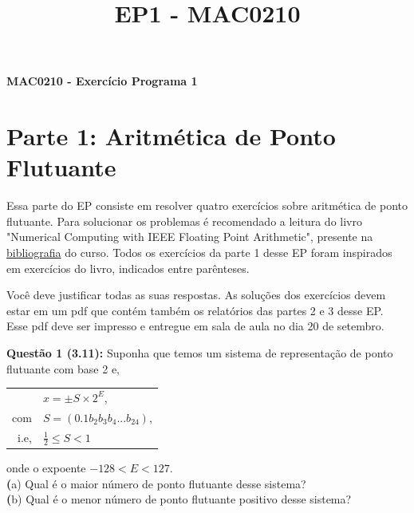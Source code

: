 \documentclass[12pt]{article}
\newcommand{\questao}[1] {\vspace{12pt} \noindent \large \textbf{Questão #1:} \normalsize}
\renewcommand{\part}[1] {\noindent\textbf (#1)}
\begin{document}
\title{EP1 - MAC0210}
\begin{flushleft}
    \textbf{\fontsize{20pt}{2em}\selectfont 
        MAC0210 - Exercício Programa 1\\}
    \fontsize{10pt}{1em}
\end{flushleft}


\section {Parte 1: Aritmética de Ponto Flutuante}
    Essa parte do EP consiste em resolver quatro exercícios sobre 
aritmética de ponto flutuante. Para solucionar os problemas é
recomendado a leitura do livro "Numerical Computing with IEEE Floating
Point Arithmetic", presente na 
\href{http://www.ime.usp.br/~egbirgin/courses/mac210/biblio.html}
{bibliografia} do 
curso. Todos os exercícios da parte 1 desse EP foram inspirados em 
exercícios do livro, indicados entre parênteses.

    Você deve justificar todas as suas respostas. As soluções dos 
exercícios devem estar em um pdf que contém também os relatórios das
partes 2 e 3 desse EP. Esse pdf deve ser impresso e entregue em sala de
aula no dia 20 de setembro.

\questao{1 (3.11)} 
Suponha que temos um sistema de representação de ponto flutuante com
base 2 e,
\begin{center}
    \begin{tabular}{r l}
             & $x = \pm S \times 2^E$,\\ 
        com  & $S = (0.1b_2b_3b_4...b_{24})$, \\
        i.e, & $\frac{1}{2} \leq S < 1$
    \end{tabular}
\end{center}
onde o expoente $-128 < E < 127$. \\ 
\part{a} Qual é o maior número de ponto flutuante desse sistema? \\
\part{b} Qual é o menor número de ponto flutuante positivo desse 
sistema? \\
\end{document}
